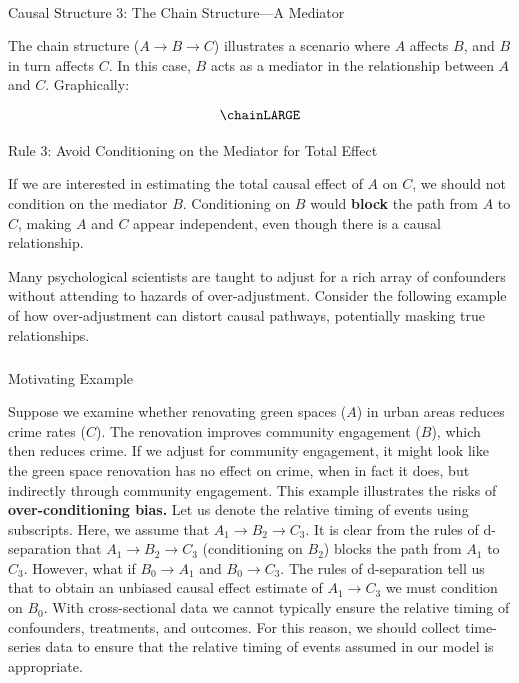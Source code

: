 \documentclass[
  singlecolumn]{article}
\makeatletter
\let\oldparagraph\paragraph
\renewcommand{\paragraph}{
    \@ifstar
      \xxxParagraphStar
      \xxxParagraphNoStar
  }
\newcommand{\xxxParagraphStar}[1]{\oldparagraph*{#1}\mbox{}}
\newcommand{\xxxParagraphNoStar}[1]{\oldparagraph{#1}\mbox{}}
\let\oldsubparagraph\subparagraph
\renewcommand{\subparagraph}{
    \@ifstar
      \xxxSubParagraphStar
      \xxxSubParagraphNoStar
  }
\newcommand{\xxxSubParagraphStar}[1]{\oldsubparagraph*{#1}\mbox{}}
\newcommand{\xxxSubParagraphNoStar}[1]{\oldsubparagraph{#1}\mbox{}}
\makeatother
\begin{document}
\paragraph{Causal Structure 3: The Chain Structure---A
Mediator}\label{causal-structure-3-the-chain-structurea-mediator}

The chain structure (\(A \rightarrow B \rightarrow C\)) illustrates a
scenario where \(A\) affects \(B\), and \(B\) in turn affects \(C\). In
this case, \(B\) acts as a mediator in the relationship between \(A\)
and \(C\). Graphically:

\[
\chainLARGE
\]

\paragraph{Rule 3: Avoid Conditioning on the Mediator for Total
Effect}\label{rule-3-avoid-conditioning-on-the-mediator-for-total-effect}

If we are interested in estimating the total causal effect of \(A\) on
\(C\), we should not condition on the mediator \(B\). Conditioning on
\(B\) would \textbf{block} the path from \(A\) to \(C\), making \(A\)
and \(C\) appear independent, even though there is a causal
relationship.

Many psychological scientists are taught to adjust for a rich array of
confounders without attending to hazards of over-adjustment. Consider
the following example of how over-adjustment can distort causal
pathways, potentially masking true relationships.

\subparagraph{Motivating Example}\label{motivating-example-2}

Suppose we examine whether renovating green spaces (\(A\)) in urban
areas reduces crime rates (\(C\)). The renovation improves community
engagement (\(B\)), which then reduces crime. If we adjust for community
engagement, it might look like the green space renovation has no effect
on crime, when in fact it does, but indirectly through community
engagement. This example illustrates the risks of
\textbf{over-conditioning bias.} Let us denote the relative timing of
events using subscripts. Here, we assume that \(A_1 \to B_2 \to C_3\).
It is clear from the rules of d-separation that
\(A_{1} \rightarrow \boxed{B_2} \rightarrow C_{3}\) (conditioning on
\(B_2\)) blocks the path from \(A_1\) to \(C_3\). However, what if
\(B_0 \to A_1\) and \(B_0 \to C_3\). The rules of d-separation tell us
that to obtain an unbiased causal effect estimate of \(A_1 \to C_3\) we
must condition on \(B_0\). With cross-sectional data we cannot typically
ensure the relative timing of confounders, treatments, and outcomes. For
this reason, we should collect time-series data to ensure that the
relative timing of events assumed in our model is appropriate.
\end{document}
